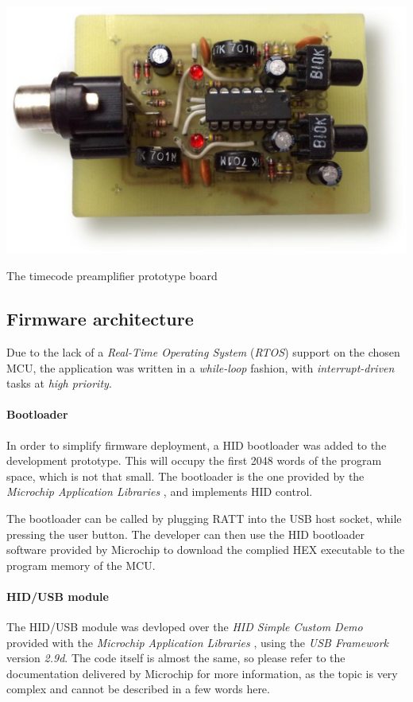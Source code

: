 \documentclass[a4paper,10pt]{article}
\makeatletter
\newenvironment{figurehere}{\def\@captype{figure}\vspace{2ex}}{\vspace{2ex}}
\makeatother
\begin{document}
\begin{multicols}{2}
\begin{figurehere}
	\centering
	\includegraphics[keepaspectratio=true,width=\columnwidth]{images/preamp_photo.pdf}
	\caption{The timecode preamplifier prototype board}
	\label{fig:preamp_photo}
\end{figurehere}


\subsection{Firmware architecture}

Due to the lack of a \emph{Real-Time Operating System} (\emph{RTOS}) support
on the chosen MCU, the application was written in a \emph{while-loop} fashion,
with \emph{interrupt-driven} tasks at \emph{high priority}.


\paragraph{Bootloader}
In order to simplify firmware deployment, a HID bootloader was added to the
development prototype. This will occupy the first 2048 words of the program
space, which is not that small. The bootloader is the one provided by the
\emph{Microchip Application Libraries} \cite{microchip_mal}, and implements
HID control.

The bootloader can be called by plugging RATT into the USB host socket, while
pressing the user button. The developer can then use the HID bootloader
software provided by Microchip to download the complied HEX executable to the
program memory of the MCU.


\paragraph{HID/USB module}
The HID/USB module was devloped over the \emph{HID Simple Custom Demo}
provided with the \emph{Microchip Application Libraries} \cite{microchip_mal},
using the \emph{USB Framework} version \emph{2.9d}. The code itself is almost
the same, so please refer to the documentation delivered by Microchip for more
information, as the topic is very complex and cannot be described in a few
words here.


\end{multicols}
\end{document}
